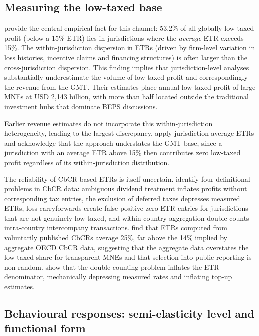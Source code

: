 \documentclass[11pt,a4paper]{article}
\begin{document}
\subsection{Measuring the low-taxed base}\label{sec:measurement}

\citet{hugger2026} provide the central empirical fact for this channel: 53.2\% of all globally low-taxed profit (below a 15\% ETR) lies in jurisdictions where the \textit{average} ETR exceeds 15\%. The within-jurisdiction dispersion in ETRs (driven by firm-level variation in loss histories, incentive claims and financing structures) is often larger than the cross-jurisdiction dispersion. This finding implies that jurisdiction-level analyses substantially underestimate the volume of low-taxed profit and correspondingly the revenue from the GMT. Their estimates place annual low-taxed profit of large MNEs at USD 2,143 billion, with more than half located outside the traditional investment hubs that dominate BEPS discussions.

Earlier revenue estimates do not incorporate this within-jurisdiction heterogeneity, leading to the largest discrepancy. \citet{barake2022} apply jurisdiction-average ETRs and acknowledge that the approach understates the GMT base, since a jurisdiction with an average ETR above 15\% then contributes zero low-taxed profit regardless of its within-jurisdiction distribution. 

The reliability of CbCR-based ETRs is itself uncertain. \citet{bobeldijk2019} identify four definitional problems in CbCR data: ambiguous dividend treatment inflates profits without corresponding tax entries, the exclusion of deferred taxes depresses measured ETRs, loss carryforwards create false-positive zero-ETR entries for jurisdictions that are not genuinely low-taxed, and within-country aggregation double-counts intra-country intercompany transactions. \citet{godar2024} find that ETRs computed from voluntarily published CbCRs average 25\%, far above the 14\% implied by aggregate OECD CbCR data, suggesting that the aggregate data overstates the low-taxed share for transparent MNEs and that selection into public reporting is non-random. \citet{blouin2023} show that the double-counting problem inflates the ETR denominator, mechanically depressing measured rates and inflating top-up estimates. 

\subsection{Behavioural responses: semi-elasticity level and functional form}\label{sec:behaviour}
\end{document}
